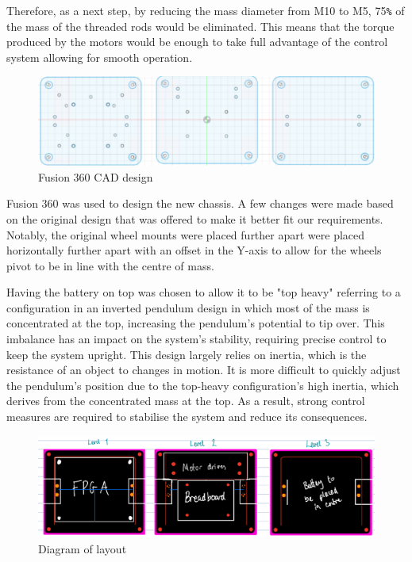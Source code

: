 Therefore, as a next step, by reducing the mass diameter from M10 to M5, 75\verb|%| of the mass of the threaded rods would be eliminated. This means that the torque produced by the motors would be enough to take full advantage of the control system allowing for smooth operation. 

\begin{figure}
    \centering
    \includegraphics[width=0.8\linewidth]{images/chassis-cad1.png}
    \caption{Fusion 360 CAD design}
\end{figure}

Fusion 360 was used to design the new chassis. A few changes were made based on the original design that was offered to make it better fit our requirements. Notably, the original wheel mounts were placed further apart were placed horizontally further apart with an offset in the Y-axis to allow for the wheels pivot to be in line with the centre of mass. 

Having the battery on top was chosen to allow it to be "top heavy" referring to a configuration in an inverted pendulum design in which most of the mass is concentrated at the top, increasing the pendulum's potential to tip over. This imbalance has an impact on the system's stability, requiring precise control to keep the system upright. This design largely relies on inertia, which is the resistance of an object to changes in motion. It is more difficult to quickly adjust the pendulum's position due to the top-heavy configuration's high inertia, which derives from the concentrated mass at the top. As a result, strong control measures are required to stabilise the system and reduce its consequences.

\begin{figure}
    \centering
    \includegraphics[width=0.8\linewidth]{images/chassis-cad2.png}
    \caption{Diagram of layout}
\end{figure}

